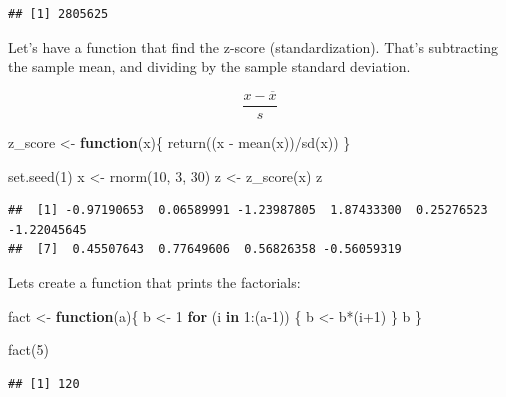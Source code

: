 \documentclass[
]{book}
\newenvironment{Shaded}{\begin{snugshade}}{\end{snugshade}}
\newcommand{\ControlFlowTok}[1]{\textcolor[rgb]{0.13,0.29,0.53}{\textbf{#1}}}
\newcommand{\DecValTok}[1]{\textcolor[rgb]{0.00,0.00,0.81}{#1}}
\newcommand{\FunctionTok}[1]{\textcolor[rgb]{0.00,0.00,0.00}{#1}}
\newcommand{\NormalTok}[1]{#1}
\newcommand{\OtherTok}[1]{\textcolor[rgb]{0.56,0.35,0.01}{#1}}
\newcommand{\SpecialCharTok}[1]{\textcolor[rgb]{0.00,0.00,0.00}{#1}}
\begin{document}
\begin{verbatim}
## [1] 2805625
\end{verbatim}

Let's have a function that find the z-score (standardization). That's subtracting the sample mean, and dividing by the sample standard deviation.

\[
\frac{x-\overline{x}}{s}
\]

\begin{Shaded}
\begin{Highlighting}[]
\NormalTok{z\_score }\OtherTok{\textless{}{-}} \ControlFlowTok{function}\NormalTok{(x)\{}
  \FunctionTok{return}\NormalTok{((x }\SpecialCharTok{{-}} \FunctionTok{mean}\NormalTok{(x))}\SpecialCharTok{/}\FunctionTok{sd}\NormalTok{(x))}
\NormalTok{\}}

\FunctionTok{set.seed}\NormalTok{(}\DecValTok{1}\NormalTok{)}
\NormalTok{x }\OtherTok{\textless{}{-}} \FunctionTok{rnorm}\NormalTok{(}\DecValTok{10}\NormalTok{, }\DecValTok{3}\NormalTok{, }\DecValTok{30}\NormalTok{)}
\NormalTok{z }\OtherTok{\textless{}{-}} \FunctionTok{z\_score}\NormalTok{(x)}
\NormalTok{z}
\end{Highlighting}
\end{Shaded}

\begin{verbatim}
##  [1] -0.97190653  0.06589991 -1.23987805  1.87433300  0.25276523 -1.22045645
##  [7]  0.45507643  0.77649606  0.56826358 -0.56059319
\end{verbatim}

Lets create a function that prints the factorials:

\begin{Shaded}
\begin{Highlighting}[]
\NormalTok{fact }\OtherTok{\textless{}{-}} \ControlFlowTok{function}\NormalTok{(a)\{}
\NormalTok{  b }\OtherTok{\textless{}{-}} \DecValTok{1}
  \ControlFlowTok{for}\NormalTok{ (i }\ControlFlowTok{in} \DecValTok{1}\SpecialCharTok{:}\NormalTok{(a}\DecValTok{{-}1}\NormalTok{)) \{}
\NormalTok{    b }\OtherTok{\textless{}{-}}\NormalTok{ b}\SpecialCharTok{*}\NormalTok{(i}\SpecialCharTok{+}\DecValTok{1}\NormalTok{) }
\NormalTok{  \}}
\NormalTok{  b}
\NormalTok{\}}

\FunctionTok{fact}\NormalTok{(}\DecValTok{5}\NormalTok{)}
\end{Highlighting}
\end{Shaded}

\begin{verbatim}
## [1] 120
\end{verbatim}
\end{document}
